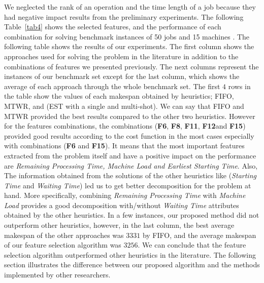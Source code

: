 \documentclass[runningheads]{llncs}
\begin{document}
We neglected the rank of an operation and the time length of a job because they had negative impact results from the preliminary experiments. The following Table~\ref{tab4} shows the selected features, and the performance of each combination for solving benchmark instances of 50 jobs and 15 machines \cite{taillard1993benchmarks}. The following table shows the results of our experiments. The first column shows the approaches used for solving the problem in the literature in addition to the combinations of features we presented previously. The next columns represent the instances of our benchmark set except for the last column, which shows the average of each approach through the whole benchmark set. The first $4$ rows in the table show the values of each makespan obtained by heuristics; FIFO, MTWR, and (EST with a single and multi-shot). We can say that FIFO and MTWR provided the best results compared to the other two heuristics. However for the features combinations, the combinations (\textbf{F6}, \textbf{F8}, \textbf{F11}, \textbf{F12}and \textbf{F15}) provided good results according to the cost function in the most cases especially with combinations (\textbf{F6} and \textbf{F15}). It means that the most important features extracted from the problem itself and have a positive impact on the performance are \textit{Remaining Processing Time, Machine Load and Earliest Starting Time}. Also, The information obtained from the solutions of the other heuristics like (\textit{Starting Time} and \textit{Waiting Time}) led us to get better decomposition for the problem at hand. More specifically, combining \textit{Remaining Processing Time} with \textit{Machine Load} provides a good decomposition with/without \textit{Waiting Time} attributes obtained by the other heuristics. In a few instances, our proposed method did not outperform other heuristics, however, in the last column, the best average makespan of the other approaches was $3331$ by FIFO, and the average makespan of our feature selection algorithm was $3256$. We can conclude that the feature selection algorithm outperformed other heuristics in the literature. The following section illustrates the difference between our proposed algorithm and the methods implemented by other researchers.
\end{document}
